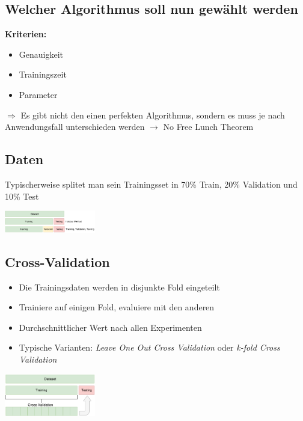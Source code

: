 \documentclass{article}
\newenvironment{Figure}
	{\par\medskip\noindent\minipage{\linewidth}}
	{\endminipage\par\medskip}
\theoremstyle{merke}
\theoremstyle{definition}
\begin{document}
	    \subsection{Welcher Algorithmus soll nun gewählt werden}
        \textbf{Kriterien:}
        \begin{itemize}
            \item Genauigkeit
            \item Trainingszeit
            \item Parameter
        \end{itemize}
        $\Rightarrow$ Es gibt nicht den einen perfekten Algorithmus, sondern es muss je nach Anwendungsfall unterschieden werden $\rightarrow$ No Free Lunch Theorem

        \subsection{Daten}
        Typischerweise splitet man sein Trainingsset in 70\% Train, 20\% Validation und 10\% Test

        \begin{Figure}
        \centering
        \includegraphics[width=150px]{img/TrainValTest.png}
            \label{fig:Aufsplittung der Daten}
        \end{Figure}

	    \subsection{Cross-Validation}
        \begin{itemize}
            \item Die Trainingsdaten werden in disjunkte Fold eingeteilt
            \item Trainiere auf einigen Fold, evaluiere mit den anderen
            \item Durchschnittlicher Wert nach allen Experimenten
            \item Typische Varianten: \textit{Leave One Out Cross Validation} oder \textit{k-fold Cross Validation}
        \end{itemize}
        \begin{Figure}
        \centering
        \includegraphics[width=150px]{img/Cross-Validation.png}
            \label{fig:Schema Cross Validation}
        \end{Figure}
\end{document}
